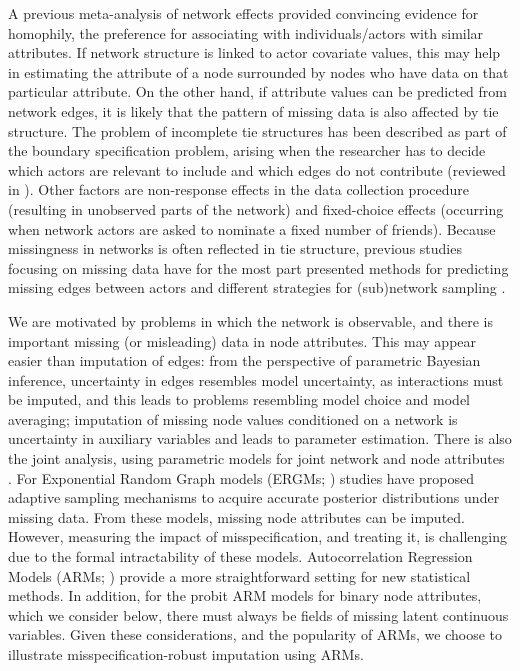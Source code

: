 \documentclass{article}
\begin{document}
A previous meta-analysis of network effects \cite{dittrich2017bayesian} provided convincing evidence for homophily, the preference for associating with individuals/actors with similar attributes. If network structure is linked to actor covariate values, this may help in estimating the attribute of a node surrounded by nodes who have data on that particular attribute. On the other hand, if attribute values can be predicted from network edges, it is likely that the pattern of missing data is also affected by tie structure. The problem of incomplete tie structures has been described as part of the boundary specification problem, arising when the researcher has to decide which actors are relevant to include and which edges do not contribute (reviewed in \cite{kossinets2006effects}). Other factors are non-response effects in the data collection procedure (resulting in unobserved parts of the network) and fixed-choice effects (occurring when network actors are asked to nominate a fixed number of friends). Because missingness in networks is often reflected in tie structure, previous studies focusing on missing data have for the most part presented methods for predicting missing edges between actors \cites{koskinen2013bayesian, huisman2009imputation} and different strategies for (sub)network sampling \cites{delahaye2017analytic, hipp2015research}.

We are motivated by problems in which the network is observable, and there is important missing (or misleading) data in node attributes. This may appear easier than imputation of edges: from the perspective of parametric Bayesian inference, uncertainty in edges resembles model uncertainty, as interactions must be imputed, and this leads to problems resembling model choice and model averaging; imputation of missing node values conditioned on a network is uncertainty in auxiliary variables and leads to parameter estimation. There is also the joint analysis, using parametric models for joint network and node attributes \cite{snijders2011statistical}. For Exponential Random Graph models (ERGMs; \cites{frank1986markov, wasserman1996logit, holland1981exponential}) studies have proposed adaptive sampling mechanisms to acquire accurate posterior distributions \cites{zimmermanimproving, koskinen2013bayesian, hancock2007modeling, gile2017analysis} under missing data. From these models, missing node attributes can be imputed. However, measuring the impact of misspecification, and treating it, is challenging due to the formal intractability of these models. Autocorrelation Regression Models (ARMs; \cites{ord1975estimation, smith2004bayesian, anselin2013spatial}) provide a more straightforward setting for new statistical methods. In addition, for the probit ARM models for binary node attributes,
 which we consider below, there must always be fields of missing latent continuous variables.
 Given these considerations, and the popularity of ARMs, we choose to illustrate misspecification-robust imputation using ARMs.
\end{document}
